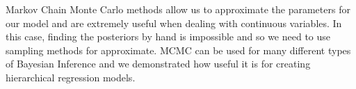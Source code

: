 \documentclass[11pt]{article}
\begin{document}
Markov Chain Monte Carlo methods allow us to approximate the parameters
for our model and are extremely useful when dealing with continuous
variables. In this case, finding the posteriors by hand is impossible
and so we need to use sampling methods for approximate. MCMC can be used
for many different types of Bayesian Inference and we demonstrated how
useful it is for creating hierarchical regression models.


    
    
    
    
\end{document}
